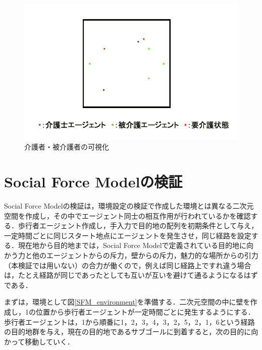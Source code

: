\begin{figure}[htb]
\begin{center}
 \includegraphics[scale=0.4]{figures/environment_v2}
 \caption[介護者・被介護者の可視化]{介護者・被介護者の可視化 \label{environment_v2}}
\end{center}
\end{figure}

\section{Social Force Modelの検証}

Social Force Modelの検証は，環境設定の検証で作成した環境とは異なる二次元空間を作成し，その中でエージェント同士の相互作用が行われているかを確認する．歩行者エージェント作成し，手入力で目的地の配列を初期条件として与え，一定時間ごとに同じスタート地点にエージェントを発生させ，同じ経路を設定する．現在地から目的地までは，Social Force Modelで定義されている目的地に向かう力と他のエージェントからの斥力，壁からの斥力，魅力的な場所からの引力（本検証では用いない）の合力が働くので，例えば同じ経路上ですれ違う場合は，たとえ経路が同じであったとしても互いが互いを避けて通るようになるはずである．

まずは，環境として図\ref{SFM_environment}を準備する．二次元空間の中に壁を作成し，1の位置から歩行者エージェントが一定時間ごとに発生するようにする．歩行者エージェントは，1から順番に1，2，3，4，3，2，5，2，1，6という経路の目的地群を与え，現在の目的地であるサブゴールに到着すると，次の目的に向かって移動していく．

